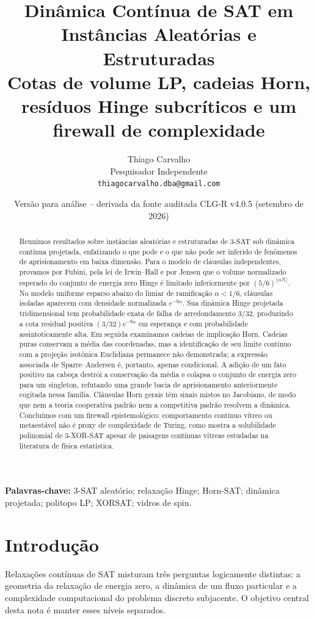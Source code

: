 \documentclass[11pt,a4paper]{article}
\title{Dinâmica Contínua de SAT em Instâncias Aleatórias e Estruturadas\\\large Cotas de volume LP, cadeias Horn, resíduos Hinge subcríticos e um firewall de complexidade}
\author{Thiago Carvalho\\Pesquisador Independente\\\texttt{thiagocarvalho.dba@gmail.com}}
\date{Versão para análise -- derivada da fonte auditada CLG-R v4.0.5 (setembro de 2026)}
\begin{document}
\maketitle
\begin{abstract}
Reunimos resultados sobre instâncias aleatórias e estruturadas de 3-SAT sob dinâmica contínua projetada, enfatizando o que pode e o que não pode ser inferido de fenômenos de aprisionamento em baixa dimensão. Para o modelo de cláusulas independentes, provamos por Fubini, pela lei de Irwin--Hall e por Jensen que o volume normalizado esperado do conjunto de energia zero Hinge é limitado inferiormente por $(5/6)^{\lfloor\alpha N\rfloor}$. No modelo uniforme esparso abaixo do limiar de ramificação $\alpha<1/6$, cláusulas isoladas aparecem com densidade normalizada $e^{-9\alpha}$. Sua dinâmica Hinge projetada tridimensional tem probabilidade exata de falha de arredondamento $3/32$, produzindo a cota residual positiva $(3/32)e^{-9\alpha}$ em esperança e com probabilidade assintoticamente alta. Em seguida examinamos cadeias de implicação Horn. Cadeias puras conservam a média das coordenadas, mas a identificação de seu limite contínuo com a projeção isotônica Euclidiana permanece não demonstrada; a expressão associada de Sparre--Andersen é, portanto, apenas condicional. A adição de um fato positivo na cabeça destrói a conservação da média e colapsa o conjunto de energia zero para um singleton, refutando uma grande bacia de aprisionamento anteriormente cogitada nessa família. Cláusulas Horn gerais têm sinais mistos no Jacobiano, de modo que nem a teoria cooperativa padrão nem a competitiva padrão resolvem a dinâmica. Concluímos com um firewall epistemológico: comportamento contínuo vítreo ou metaestável não é proxy de complexidade de Turing, como mostra a solubilidade polinomial de 3-XOR-SAT apesar de paisagens contínuas vítreas estudadas na literatura de física estatística.
\end{abstract}
\noindent\textbf{Palavras-chave:} 3-SAT aleatório; relaxação Hinge; Horn-SAT; dinâmica projetada; politopo LP; XORSAT; vidros de spin.

\section{Introdução}
Relaxações contínuas de SAT misturam três perguntas logicamente distintas: a geometria da relaxação de energia zero, a dinâmica de um fluxo particular e a complexidade computacional do problema discreto subjacente. O objetivo central desta nota é manter esses níveis separados.
\end{document}

